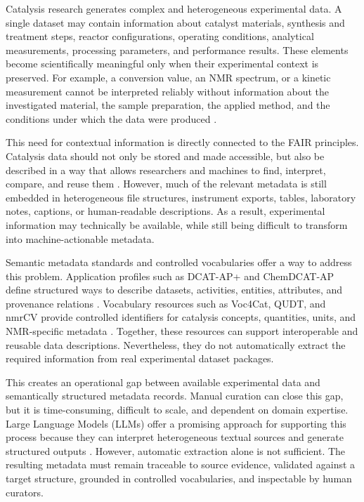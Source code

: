 \label{chap:Introduction}

Catalysis research generates complex and heterogeneous experimental data.
A single dataset may contain information about catalyst materials, synthesis and treatment steps, reactor configurations, operating conditions, analytical measurements, processing parameters, and performance results.
These elements become scientifically meaningful only when their experimental context is preserved.
For example, a conversion value, an \ac{NMR} spectrum, or a kinetic measurement cannot be interpreted reliably without information about the investigated material, the sample preparation, the applied method, and the conditions under which the data were produced \cite{mendes2021opendata,mendes2025data}.

This need for contextual information is directly connected to the \ac{FAIR} principles.
Catalysis data should not only be stored and made accessible, but also be described in a way that allows researchers and machines to find, interpret, compare, and reuse them \cite{wilkinson2016fair,mendes2025data}.
However, much of the relevant metadata is still embedded in heterogeneous file structures, instrument exports, tables, laboratory notes, captions, or human-readable descriptions.
As a result, experimental information may technically be available, while still being difficult to transform into machine-actionable metadata.

Semantic metadata standards and controlled vocabularies offer a way to address this problem.
Application profiles such as \ac{DCAT-AP+} and \ac{ChemDCAT-AP} define structured ways to describe datasets, activities, entities, attributes, and provenance relations \cite{stroemert2026chemdcat,dcatapplusDocumentation,chemdcatapDocumentation}.
Vocabulary resources such as \ac{Voc4Cat}, \ac{QUDT}, and \ac{nmrCV} provide controlled identifiers for catalysis concepts, quantities, units, and \ac{NMR}-specific metadata \cite{david_linke_2023_8313340,qudt2022schema,Schober2018nmrML}.
Together, these resources can support interoperable and reusable data descriptions.
Nevertheless, they do not automatically extract the required information from real experimental dataset packages.

This creates an operational gap between available experimental data and semantically structured metadata records.
Manual curation can close this gap, but it is time-consuming, difficult to scale, and dependent on domain expertise.
Large Language Models (LLMs) offer a promising approach for supporting this process because they can interpret heterogeneous textual sources and generate structured outputs \cite{dagdelen2024structured,schilling2025text,xu2024generativeie}.
However, automatic extraction alone is not sufficient.
The resulting metadata must remain traceable to source evidence, validated against a target structure, grounded in controlled vocabularies, and inspectable by human curators.

